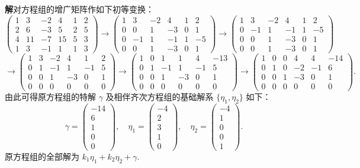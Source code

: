 \documentclass[UTF8, 12pt, fontset=fandol, oneside]{ctexart}
\begin{document}
\noindent\textbf{解}\quad 对方程组的增广矩阵作如下初等变换：
\[
\left(\begin{array}{rrrrr|r}
1&3&-2&4&1&2\\
2&6&-3&5&2&5\\
4&11&-7&15&5&3\\
1&3&-1&1&1&3
\end{array}\right)
\to
\left(\begin{array}{rrrrr|r}
1&3&-2&4&1&2\\
0&0&1&-3&0&1\\
0&-1&1&-1&1&-5\\
0&0&1&-3&0&1
\end{array}\right)
\to
\left(\begin{array}{rrrrr|r}
1&3&-2&4&1&2\\
0&-1&1&-1&1&-5\\
0&0&1&-3&0&1\\
0&0&1&-3&0&1
\end{array}\right)
\]
\[
\to
\left(\begin{array}{rrrrr|r}
1&3&-2&4&1&2\\
0&1&-1&1&-1&5\\
0&0&1&-3&0&1\\
0&0&0&0&0&0
\end{array}\right)
\to
\left(\begin{array}{rrrrr|r}
1&0&1&1&4&-13\\
0&1&-1&1&-1&5\\
0&0&1&-3&0&1\\
0&0&0&0&0&0
\end{array}\right)
\to
\left(\begin{array}{rrrrr|r}
1&0&0&4&4&-14\\
0&1&0&-2&-1&6\\
0&0&1&-3&0&1\\
0&0&0&0&0&0
\end{array}\right).
\]
由此可得原方程组的特解 $\gamma$ 及相伴齐次方程组的基础解系 $\{\eta_1,\eta_2\}$ 如下：
\[
\gamma=\left(\begin{array}{r}
-14\\
6\\
1\\
0\\
0
\end{array}\right),\quad
\eta_1=\left(\begin{array}{r}
-4\\
2\\
3\\
1\\
0
\end{array}\right),\quad
\eta_2=\left(\begin{array}{r}
-4\\
1\\
0\\
0\\
1
\end{array}\right).
\]
原方程组的全部解为 $k_1\eta_1+k_2\eta_2+\gamma$.
\end{document}
